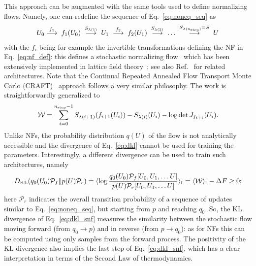 \documentclass[12pt]{article}
\begin{document}
This approach can be augmented with the same tools used to define normalizing flows. Namely, one can redefine the sequence of Eq.~\eqref{eq:noneq_seq} as
\begin{equation}
    U_0 \stackrel{f_1}{\longrightarrow} \; f_1(U_0) \;
  \stackrel{S_{\lambda(1)}}{\longrightarrow} \; U_1 \;
  \stackrel{f_2}{\longrightarrow} \; f_2(U_1) \;
  \stackrel{S_{\lambda(2)}}{\longrightarrow} \; \dots \;
  \stackrel{S_{\lambda(n_{\rm step})} \equiv S}{\longrightarrow} \;  U
\end{equation}
with the $f_i$ being for example the invertible transformations defining the NF in Eq.~\eqref{eq:nf_def}: this defines a stochastic normalizing flow~\cite{wu2020stochastic} which has been extensively implemented in lattice field theory~\cite{Caselle:2022acb,Caselle:2024ent,Bulgarelli:2024brv,Bonanno:2025pdp}; see also Ref.~\cite{Chen:2026bqw} for related architectures. Note that the Continual Repeated Annealed Flow Transport Monte Carlo (CRAFT)~\cite{Matthews:2022sds} approach follows a very similar philosophy. The work is straightforwardly generalized to
\begin{equation}
\label{eq:work_snf}
    \mathcal{W} = \sum_{i=0}^{n_{\rm step}-1} S_{\lambda(i+1)} (f_{i+1}(U_i)) - S_{\lambda(i)} (U_i) - \log \det J_{f_{i+1}} (U_i).
\end{equation}
Unlike NFs, the probability distribution $q(U)$ of the flow is not analytically accessible and the divergence of Eq.~\eqref{eq:dkl} cannot be used for training the parameters. Interestingly, a different divergence can be used to train such architectures, namely
\begin{equation}
\label{eq:dkl_snf}
    D_{\rm KL} (q_0(U_0) \mathcal{P}_f \| p(U) \mathcal{P}_r) = \langle \log \frac{q_0(U_0) \mathcal{P}_f[U_0, U_1, \dots U]}{p(U) \mathcal{P}_r[U_0, U_1, \dots U]} \rangle_{\mathrm{f}} = \langle \mathcal{W} \rangle_\mathrm{f} - \Delta F \geq 0;
\end{equation}
here $\mathcal{P}_r$ indicates the overall transition probability of a sequence of updates similar to Eq.~\eqref{eq:noneq_seq}, but starting from $p$ and reaching $q_0$.
So, the KL divergence of Eq.~\eqref{eq:dkl_snf} measures the similarity between the stochastic flow moving forward (from $q_0 \to p$) and in reverse (from $p \to q_0$): as for NFs this can be computed using only samples from the forward process. The positivity of the KL divergence also implies the last step of Eq.~\eqref{eq:dkl_snf}, which has a clear interpretation in terms of the Second Law of thermodynamics.
\end{document}
